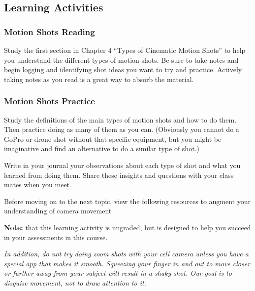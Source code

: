\documentclass[
]{book}
\begin{document}
\hypertarget{learning-activities-12}{%
\subsection*{Learning Activities}\label{learning-activities-12}}

\begin{reflect}
\hypertarget{motion-shots-reading}{%
\subsubsection*{Motion Shots Reading}\label{motion-shots-reading}}

Study the first section in Chapter 4 ``Types of Cinematic Motion Shots'' to help you understand the different types of motion shots. Be sure to take notes and begin logging and identifying shot ideas you want to try and practice. Actively taking notes as you read is a great way to absorb the material.

\hypertarget{motion-shots-practice}{%
\subsubsection*{Motion Shots Practice}\label{motion-shots-practice}}

Study the definitions of the main types of motion shots and how to do them. Then practice doing as many of them as you can. (Obviously you cannot do a GoPro or drone shot without that specific equipment, but you might be imaginative and find an alternative to do a similar type of shot.)

Write in your journal your observations about each type of shot and what you learned from doing them. Share these insights and questions with your class mates when you meet.

Before moving on to the next topic, view the following resources to augment your understanding of camera movement
\end{reflect}

\begin{caution}
\textbf{Note:} that this learning activity is ungraded, but is designed to help you succeed in your assessments in this course.

\emph{In addition, do not try doing zoom shots with your cell camera unless you have a special app that makes it smooth. Squeezing your finger in and out to move closer or further away from your subject will result in a shaky shot. Our goal is to disguise movement, not to draw attention to it.}
\end{caution}
\end{document}
